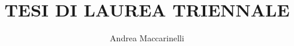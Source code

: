 \documentclass[12pt,twoside,a4paper,fleqn,openright]{book}
\author{Andrea Maccarinelli}
\title{TESI DI LAUREA TRIENNALE}
\begin{document}

\maketitle

\pagestyle{empty}

\tableofcontents


\pagestyle{fancyplain}
\addtolength{\headwidth}{\marginparsep}
\addtolength{\headwidth}{\marginparwidth}
\renewcommand{\chaptermark}[1]{\markboth{{\chaptername\ \thechapter}\ \--- #1}{}} %
\renewcommand{\sectionmark}[1]{\markright{\thesection\ \ #1}}
\lhead[\fancyplain{}{\thepage}]{\fancyplain{}{\emph\rightmark}}
\rhead[\fancyplain{}{\emph\leftmark}]{\fancyplain{}{\thepage}}
\cfoot{}



  
    
    
    
         
         

\begin{comment} 




\end{comment}
\end{document}
